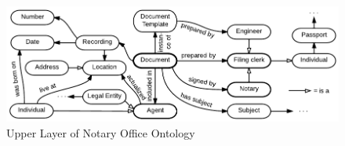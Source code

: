\documentclass[conference]{IEEEtran}
\begin{document}
\begin{figure}[!t]
\centering
\includegraphics[width=\linewidth]{DocumentOntology-en.pdf}
\caption{Upper Layer of Notary Office Ontology}
\label{notaryontology}
\end{figure}



\end{document}
